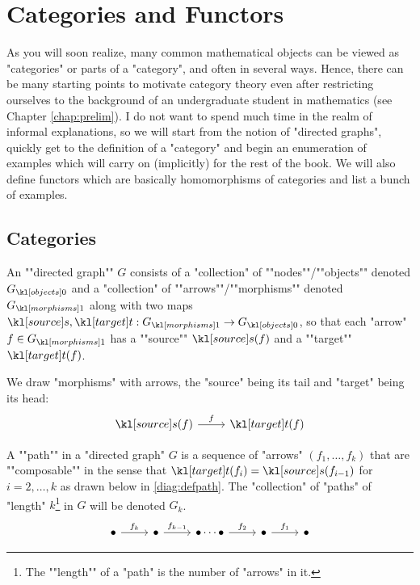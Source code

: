 \documentclass[main.tex]{subfiles}
\begin{document}
\chapter{Categories and Functors}\label{chap:catfunc}
As you will soon realize, many common mathematical objects can be viewed as "categories" or parts of a "category", and often in several ways. Hence, there can be many starting points to motivate category theory even after restricting ourselves to the background of an undergraduate student in mathematics (see Chapter \ref{chap:prelim}). I do not want to spend much time in the realm of informal explanations, so we will start from the notion of "directed graphs", quickly get to the definition of a "category" and begin an enumeration of examples which will carry on (implicitly) for the rest of the book. We will also define functors which are basically homomorphisms of categories and list a bunch of examples.
\section{Categories}

\begin{defn}
	\AP An ""directed graph"" $G$ consists of a "collection" of ""nodes""/""objects"" denoted $\obj{G}$ and a "collection" of ""arrows""/""morphisms"" denoted $\mor{G}$ along with \AP two maps $\source,\target: \mor{G} \rightarrow \obj{G}$, so that each "arrow" $f \in \mor{G}$ has a ""source"" $\source(f)$ and a ""target"" $\target(f)$.\begin{marginfigure}We draw "morphisms" with arrows, the "source" being its tail and "target" being its head:\begin{equation*}
		\begin{tikzcd}
		{\source(f)} & {\target(f)}
		\arrow["f", from=1-1, to=1-2]
		\end{tikzcd}	
	\end{equation*}\end{marginfigure}
\end{defn}
\begin{defn}[Paths]
	\AP A ""path"" in a "directed graph" $G$ is a sequence of "arrows" $(f_1, \dots, f_k)$ that are ""composable"" in the sense that $\target(f_i) = \source(f_{i-1})$ for $i=2,\dots, k$ as drawn below in \eqref{diag:defpath}. The "collection" of "paths" of "length" $k$\footnote{\AP The ""length"" of a "path" is the number of "arrows" in it.} in $G$ will be denoted $G_k$.
	\begin{equation}\label{diag:defpath}
		\begin{tikzcd}
			\bullet \arrow[r, "f_k"] & \bullet \arrow[r, "f_{k-1}"] & \bullet\cdots\bullet \arrow[r, "f_2"] & \bullet \arrow[r, "f_1"] & \bullet
		\end{tikzcd}
	\end{equation}
\end{defn}
\end{document}
